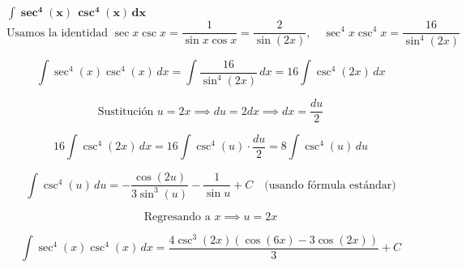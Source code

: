 $\displaystyle \mathbf{\int \sec^{4}(x)\, \csc^{4}(x)\, dx}$
\nopagebreak
\[
\text{Usamos la identidad } \sec x \csc x = \frac{1}{\sin x \cos x} = \frac{2}{\sin(2x)}, 
\quad \sec^4 x \csc^4 x = \frac{16}{\sin^4(2x)}
\]

\[
\int \sec^4(x) \csc^4(x)\, dx = \int \frac{16}{\sin^4(2x)}\, dx = 16 \int \csc^4(2x)\, dx
\]

\[
\text{Sustitución } u = 2x \implies du = 2 dx \implies dx = \frac{du}{2}
\]

\[
16 \int \csc^4(2x)\, dx = 16 \int \csc^4(u) \cdot \frac{du}{2} = 8 \int \csc^4(u)\, du
\]

\[
\int \csc^4(u)\, du = -\frac{\cos(2u)}{3 \sin^3(u)} - \frac{1}{\sin u} + C \quad \text{(usando fórmula estándar)}
\]

\[
\text{Regresando a } x \implies u = 2x
\]

\[
\boxed{\displaystyle 
\int \sec^4(x) \csc^4(x)\, dx = \frac{4 \csc^3(2x) (\cos(6x) - 3 \cos(2x))}{3} + C
}
\]
